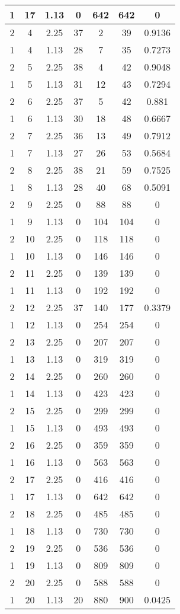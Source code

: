 \documentclass[letterpaper, 12pt]{article}
\begin{document}
\begin{longtable}{|c|c|c|c|c|c|c|}
1 & 17 & 1.13 & 0 & 642 & 642 & 0 \\
\hline
2 & 4 & 2.25 & 37 & 2 & 39 & 0.9136 \\
\hline
1 & 4 & 1.13 & 28 & 7 & 35 & 0.7273 \\
\hline
2 & 5 & 2.25 & 38 & 4 & 42 & 0.9048 \\
\hline
1 & 5 & 1.13 & 31 & 12 & 43 & 0.7294 \\
\hline
2 & 6 & 2.25 & 37 & 5 & 42 & 0.881 \\
\hline
1 & 6 & 1.13 & 30 & 18 & 48 & 0.6667 \\
\hline
2 & 7 & 2.25 & 36 & 13 & 49 & 0.7912 \\
\hline
1 & 7 & 1.13 & 27 & 26 & 53 & 0.5684 \\
\hline
2 & 8 & 2.25 & 38 & 21 & 59 & 0.7525 \\
\hline
1 & 8 & 1.13 & 28 & 40 & 68 & 0.5091 \\
\hline
2 & 9 & 2.25 & 0 & 88 & 88 & 0 \\
\hline
1 & 9 & 1.13 & 0 & 104 & 104 & 0 \\
\hline
2 & 10 & 2.25 & 0 & 118 & 118 & 0 \\
\hline
1 & 10 & 1.13 & 0 & 146 & 146 & 0 \\
\hline
2 & 11 & 2.25 & 0 & 139 & 139 & 0 \\
\hline
1 & 11 & 1.13 & 0 & 192 & 192 & 0 \\
\hline
2 & 12 & 2.25 & 37 & 140 & 177 & 0.3379 \\
\hline
1 & 12 & 1.13 & 0 & 254 & 254 & 0 \\
\hline
2 & 13 & 2.25 & 0 & 207 & 207 & 0 \\
\hline
1 & 13 & 1.13 & 0 & 319 & 319 & 0 \\
\hline
2 & 14 & 2.25 & 0 & 260 & 260 & 0 \\
\hline
1 & 14 & 1.13 & 0 & 423 & 423 & 0 \\
\hline
2 & 15 & 2.25 & 0 & 299 & 299 & 0 \\
\hline
1 & 15 & 1.13 & 0 & 493 & 493 & 0 \\
\hline
2 & 16 & 2.25 & 0 & 359 & 359 & 0 \\
\hline
1 & 16 & 1.13 & 0 & 563 & 563 & 0 \\
\hline
2 & 17 & 2.25 & 0 & 416 & 416 & 0 \\
\hline
1 & 17 & 1.13 & 0 & 642 & 642 & 0 \\
\hline
2 & 18 & 2.25 & 0 & 485 & 485 & 0 \\
\hline
1 & 18 & 1.13 & 0 & 730 & 730 & 0 \\
\hline
2 & 19 & 2.25 & 0 & 536 & 536 & 0 \\
\hline
1 & 19 & 1.13 & 0 & 809 & 809 & 0 \\
\hline
2 & 20 & 2.25 & 0 & 588 & 588 & 0 \\
\hline
1 & 20 & 1.13 & 20 & 880 & 900 & 0.0425 \\
\hline
\end{longtable}
\end{document}

